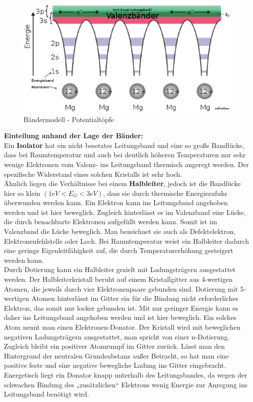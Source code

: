 \documentclass[12pt]{article}
\begin{document}
\begin{figure}[H]
\centering
\includegraphics[width=0.9\linewidth]{pictures/baendermodell.eps}
\caption{Bändermodell - Potentialtöpfe}
\end{figure}

\textbf{Einteilung anhand der Lage der Bänder:} \\

Ein \textbf{Isolator} hat ein nicht besetztes Leitungsband und eine so große Bandlücke, dass bei Raumtemperatur und auch bei
deutlich höheren Temperaturen nur sehr wenige Elektronen vom Valenz- ins Leitungsband thermisch angeregt werden. Der
spezifische Widerstand eines solchen Kristalls ist sehr hoch.\\

Ähnlich liegen die Verhältnisse bei einem \textbf{Halbleiter}, jedoch ist die Bandlücke hier so klein $(1 eV < E_G < 3 eV)$,
dass sie durch thermische Energiezufuhr überwunden werden kann. Ein Elektron kann ins Leitungsband angehoben werden und ist
hier beweglich. Zugleich hinterlässt es im Valenzband eine Lücke, die durch benachbarte Elektronen aufgefüllt werden kann.
Somit ist im Valenzband die Lücke beweglich. Man bezeichnet sie auch als Defektelektron, Elektronenfehlstelle oder Loch. Bei
Raumtemperatur weist ein Halbleiter dadurch eine geringe Eigenleitfähigkeit auf, die durch Temperaturerhöhung gesteigert
werden kann. \\

Durch Dotierung kann ein Halbleiter gezielt mit Ladungsträgern ausgestattet werden. Der Halbleiterkristall beruht auf einem
Kristallgitter aus 4-wertigen Atomen, die jeweils durch vier Elektronenpaare gebunden sind. Dotierung mit 5-wertigen Atomen
hinterlässt im Gitter ein für die Bindung nicht erforderliches Elektron, das somit nur locker gebunden ist. Mit nur geringer
Energie kann es daher ins Leitungsband angehoben werden und ist hier beweglich. Ein solches Atom nennt man einen
Elektronen-Donator. Der Kristall wird mit beweglichen negativen Ladungsträgern ausgestattet, man spricht von einer
n-Dotierung. Zugleich bleibt ein positiver Atomrumpf im Gitter zurück. Lässt man den Hintergrund der neutralen Grundsubstanz
außer Betracht, so hat man eine positive feste und eine negative bewegliche Ladung ins Gitter eingebracht. Energetisch liegt
ein Donator knapp unterhalb des Leitungsbandes, da wegen der schwachen Bindung des „zusätzlichen“ Elektrons wenig Energie zur Anregung ins Leitungsband benötigt wird. \\
\end{document}
